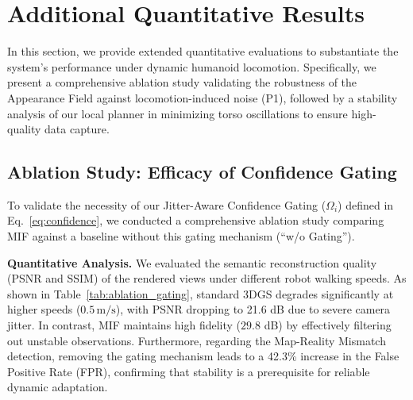\documentclass[conference]{IEEEtran}
\begin{document}
\section{Additional Quantitative Results}
\label{sec:add_experiments}

In this section, we provide extended quantitative evaluations to substantiate the system's performance under dynamic humanoid locomotion. Specifically, we present a comprehensive ablation study validating the robustness of the Appearance Field against locomotion-induced noise (P1), followed by a stability analysis of our local planner in minimizing torso oscillations to ensure high-quality data capture.

\subsection{Ablation Study: Efficacy of Confidence Gating}
\label{sec:ablation_study}

To validate the necessity of our Jitter-Aware Confidence Gating ($\Omega_i$) defined in Eq.~\ref{eq:confidence}, we conducted a comprehensive ablation study comparing MIF against a baseline without this gating mechanism (``w/o Gating'').


\textbf{Quantitative Analysis.} We evaluated the semantic reconstruction quality (PSNR and SSIM) of the rendered views under different robot walking speeds. As shown in Table~\ref{tab:ablation_gating}, standard 3DGS degrades significantly at higher speeds ($0.5\,\text{m/s}$), with PSNR dropping to 21.6 dB due to severe camera jitter. In contrast, MIF maintains high fidelity ($29.8$ dB) by effectively filtering out unstable observations. Furthermore, regarding the Map-Reality Mismatch detection, removing the gating mechanism leads to a 42.3\% increase in the False Positive Rate (FPR), confirming that stability is a prerequisite for reliable dynamic adaptation.


\begin{table}[h]
\centering
\caption{\textbf{Quantitative Comparison of Confidence Gating under Motion.}}
\label{tab:ablation_gating}
\end{table}
\end{document}
